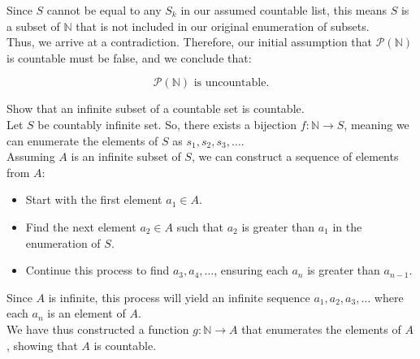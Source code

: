\begin{example}
    Since \( S \) cannot be equal to any \( S_k \) in our assumed countable list, this means \( S \) is a subset of \( \mathbb{N} \) that is not included in our original enumeration of subsets. \\
    
    Thus, we arrive at a contradiction. Therefore, our initial assumption that \( \mathcal{P}(\mathbb{N}) \) is countable must be false, and we conclude that:
    
    \[
    \mathcal{P}(\mathbb{N}) \text{ is uncountable.}
    \]    
\end{example}

\begin{example}
    Show that an infinite subset of a countable set is countable. \\

    Let $S$ be countably infinite set. So, there exists a bijection \( f: \mathbb{N} \to S \), meaning we can enumerate the elements of \( S \) as \( s_1, s_2, s_3, \ldots \). \\

    Assuming \( A \) is an infinite subset of \( S \), we can construct a sequence of elements from \( A \):
    \begin{itemize}
        \item Start with the first element \( a_1 \in A \).
        \item Find the next element \( a_2 \in A \) such that \( a_2 \) is greater than \( a_1 \) in the enumeration of \( S \).
        \item  Continue this process to find \( a_3, a_4, \ldots \), ensuring each \( a_n \) is greater than \( a_{n-1} \).
    \end{itemize}

    Since \( A \) is infinite, this process will yield an infinite sequence \( a_1, a_2, a_3, \ldots \) where each \( a_n \) is an element of \( A \).\\

We have thus constructed a function \( g: \mathbb{N} \to A \) that enumerates the elements of \( A \), showing that \( A \) is countable.
\end{example}
